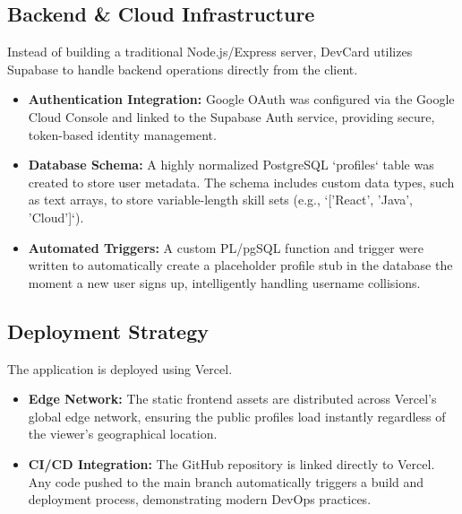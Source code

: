 \documentclass[12pt,a4paper]{report}     %
\begin{document}
\vspace{0.3cm}

\section{Backend \& Cloud Infrastructure}

Instead of building a traditional Node.js/Express server, DevCard utilizes Supabase to handle backend operations directly from the client.

\begin{itemize}
    \item \textbf{Authentication Integration:} Google OAuth was configured via the Google Cloud Console and linked to the Supabase Auth service, providing secure, token-based identity management.
    \item \textbf{Database Schema:} A highly normalized PostgreSQL `profiles` table was created to store user metadata. The schema includes custom data types, such as text arrays, to store variable-length skill sets (e.g., `['React', 'Java', 'Cloud']`).
    \item \textbf{Automated Triggers:} A custom PL/pgSQL function and trigger were written to automatically create a placeholder profile stub in the database the moment a new user signs up, intelligently handling username collisions.
\end{itemize}

\vspace{0.3cm}


\section{Deployment Strategy}

The application is deployed using Vercel.

\begin{itemize}
    \item \textbf{Edge Network:} The static frontend assets are distributed across Vercel's global edge network, ensuring the public profiles load instantly regardless of the viewer's geographical location.
    \item \textbf{CI/CD Integration:} The GitHub repository is linked directly to Vercel. Any code pushed to the main branch automatically triggers a build and deployment process, demonstrating modern DevOps practices.
\end{itemize}
\chapter{}
\end{document}
